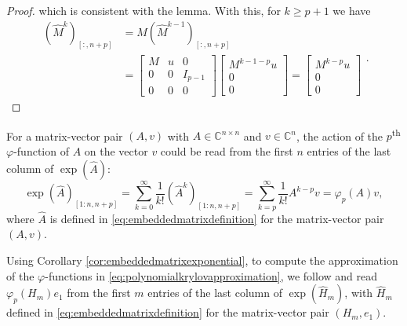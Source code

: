 \begin{proof}
    which is consistent with the lemma.
    With this, for $k \ge p+1$ we have
    \begin{equation*}
        \begin{aligned}
            (\hat{M}^k)_{[:, n+p]} & = \hat{M} (\hat{M}^{k-1})_{[:, n+p]} \\
            & =
            \begin{bmatrix} M & u & 0\\ 0 & 0 & I_{p-1}\\ 0 & 0 & 0 \end{bmatrix}
            \begin{bmatrix} M^{k-1-p} u \\ 0 \\ 0 \end{bmatrix}
            =
            \begin{bmatrix} M^{k-p} u \\ 0 \\ 0 \end{bmatrix}
        \end{aligned}.
    \end{equation*}
\end{proof}

\begin{corollary}
    \label{cor:embeddedmatrixexponential}
    For a matrix-vector pair $(A, v)$ with $A \in \mathbb{C}^{n \times n}$ and
    $v \in \mathbb{C}^n$, the action of the $p$\textsuperscript{th} $\varphi$-function
    of $A$ on the vector $v$ could be read from the first $n$ entries of the last
    column of $\exp(\hat{A})$:
    \begin{equation*}
        \exp(\hat{A})_{[1 : n, n+p]}
        = \sum_{k=0}^{\infty}{\frac{1}{k!} (\hat{A}^k)_{[1 : n, n+p]}}
        = \sum_{k=p}^{\infty}{\frac{1}{k!} A^{k-p} v} = \varphi_p(A) v,
    \end{equation*}
    where $\hat{A}$ is defined in \eqref{eq:embeddedmatrixdefinition} for the matrix-vector
    pair $(A, v)$.
\end{corollary}

Using Corollary \ref{cor:embeddedmatrixexponential}, to compute the approximation
of the $\varphi$-functions in \eqref{eq:polynomialkrylovapproximation},
we follow \cite{niesen2012} and read $\varphi_p(H_m) e_1$ from the first $m$ entries
of the last column of $\exp(\hat{H}_m)$, with $\hat{H}_m$ defined in
\eqref{eq:embeddedmatrixdefinition} for the matrix-vector pair $(H_m, e_1)$.

